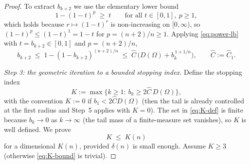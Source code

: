\documentclass[11pt]{amsart}
\theoremstyle{definition}
\newcommand{\R}{\mathbb R}
\newcommand{\Om}{\Omega}
\begin{document}
\begin{proof}
To extract $b_{k+2}$ we use the elementary lower bound
\begin{equation}\label{eq:power-lb}
   1-(1-t)^{p}\;\ge\;t\qquad\text{for all }t\in[0,1],\ p\ge1,
\end{equation}
which holds because $r\mapsto(1-t)^{r}$ is non-increasing on $[0,\infty)$,
so $(1-t)^{p}\le(1-t)^{1}=1-t$ for $p=(n+2)/n\ge1$. Applying
\eqref{eq:power-lb} with $t=b_{k+2}\in[0,1]$ and $p=(n+2)/n$,
\begin{equation}\label{eq:bk2-bound}
   b_{k+2}\;\le\;1-(1-b_{k+2})^{(n+2)/n}
   \;\le\;\widehat C\,\bigl(D(\Om)+b_k^{\,1+1/n}\bigr),
   \qquad \widehat C:=\widehat C_1 .
\end{equation}

\smallskip
\emph{Step 3: the geometric iteration to a bounded stopping index.}
Define the stopping index
\begin{equation}\label{eq:K-def}
   K:=\max\bigl\{k\ge1:\ b_k\ge2\widehat C\,D(\Om)\bigr\},
\end{equation}
with the convention $K:=0$ if $b_1<2\widehat C D(\Om)$ (then the tail is
already controlled at the first radius and Step~5 applies with $K=0$).
The set in \eqref{eq:K-def} is finite because $b_k\to0$ as $k\to\infty$
(the tail mass of a finite-measure set vanishes), so $K$ is well defined.
We prove
\begin{equation}\label{eq:K-bound}
   K\;\le\;K(n)
\end{equation}
for a dimensional $K(n)$, provided $\delta(n)$ is small enough. Assume
$K\ge3$ (otherwise \eqref{eq:K-bound} is trivial).


\end{proof}
\end{document}
